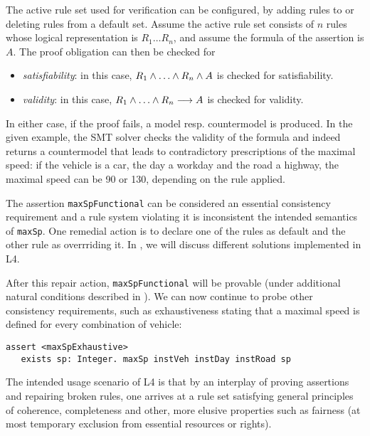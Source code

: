 The active rule set used for verification can be configured, by adding rules
to or deleting rules from a default set. Assume the active rule set consists
of $n$ rules whose logical representation is $R_1 \dots R_n$, and assume the
formula of the assertion is $A$. The proof obligation can then be checked for
\begin{itemize}
\item  \emph{satisfiability}: in this case, $R_1 \AND \dots \AND R_n \AND A$
  is checked for satisfiability.
\item \emph{validity}: in this case, $R_1 \AND \dots \AND R_n \IMPL A$ is
  checked for validity.
\end{itemize}
In either case, if the proof fails, a model resp.{} countermodel is produced.
In the given example, the SMT solver checks the validity of the formula and
indeed returns a countermodel that leads to contradictory prescriptions of the
maximal speed: if the vehicle is a car, the day a workday and the road a
highway, the maximal speed can be 90 or 130, depending on the rule applied.

The assertion \texttt{maxSpFunctional} can be considered an essential
consistency requirement and a rule system violating it is inconsistent \wrt{} the intended semantics of \texttt{maxSp}. One
remedial action is to declare one of the rules as default and the other rule
as overrriding it. In , we will discuss different solutions
implemented in L4.

After this repair action, \texttt{maxSpFunctional} will be provable (under
additional natural conditions described in ). We can now
continue to probe other consistency requirements, such as exhaustiveness
stating that a maximal speed is defined for every combination of vehicle:

\begin{lstlisting}
assert <maxSpExhaustive>
   exists sp: Integer. maxSp instVeh instDay instRoad sp
\end{lstlisting}

The intended usage scenario of L4 is that by an interplay of proving
assertions and repairing broken rules, one arrives at a rule set satisfying
general principles of coherence, completeness and other, more elusive
properties such as fairness (at most temporary exclusion from essential
resources or rights).

